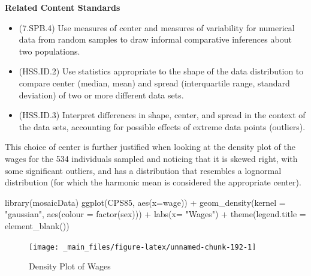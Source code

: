\documentclass[
]{book}
\newenvironment{Shaded}{\begin{snugshade}}{\end{snugshade}}
\newcommand{\AttributeTok}[1]{\textcolor[rgb]{0.77,0.63,0.00}{#1}}
\newcommand{\FunctionTok}[1]{\textcolor[rgb]{0.00,0.00,0.00}{#1}}
\newcommand{\NormalTok}[1]{#1}
\newcommand{\SpecialCharTok}[1]{\textcolor[rgb]{0.00,0.00,0.00}{#1}}
\newcommand{\StringTok}[1]{\textcolor[rgb]{0.31,0.60,0.02}{#1}}
\providecommand{\tightlist}{%
  \setlength{\itemsep}{0pt}\setlength{\parskip}{0pt}}
\newenvironment{standards}{}{}
\theoremstyle{definition}
\theoremstyle{definition}
\theoremstyle{definition}
\theoremstyle{definition}
\theoremstyle{remark}
\begin{document}
\begin{standards}

\begin{center}
\textbf{Related Content Standards}

\end{center}

\begin{itemize}
\tightlist
\item
  (7.SPB.4) Use measures of center and measures of variability for numerical data from random samples to draw informal comparative inferences about two populations.
\item
  (HSS.ID.2) Use statistics appropriate to the shape of the data distribution to compare center (median, mean) and spread (interquartile range, standard deviation) of two or more different data sets.
\item
  (HSS.ID.3) Interpret differences in shape, center, and spread in the context of the data sets, accounting for possible effects of extreme data points (outliers).
\end{itemize}

\end{standards}

This choice of center is further justified when looking at the density plot of the wages for the 534 individuals sampled and noticing that it is skewed right, with some significant outliers, and has a distribution that resembles a lognormal distribution (for which the harmonic mean is considered the appropriate center).

\begin{Shaded}
\begin{Highlighting}[]
\FunctionTok{library}\NormalTok{(mosaicData)}
\FunctionTok{ggplot}\NormalTok{(CPS85, }\FunctionTok{aes}\NormalTok{(}\AttributeTok{x=}\NormalTok{wage)) }\SpecialCharTok{+} \FunctionTok{geom\_density}\NormalTok{(}\AttributeTok{kernel =} \StringTok{"gaussian"}\NormalTok{, }\FunctionTok{aes}\NormalTok{(}\AttributeTok{colour =} \FunctionTok{factor}\NormalTok{(sex))) }\SpecialCharTok{+} \FunctionTok{labs}\NormalTok{(}\AttributeTok{x=} \StringTok{"Wages"}\NormalTok{) }\SpecialCharTok{+} \FunctionTok{theme}\NormalTok{(}\AttributeTok{legend.title =} \FunctionTok{element\_blank}\NormalTok{())}
\end{Highlighting}
\end{Shaded}

\begin{figure}

{\centering \texttt{[image: \_main\_files/figure-latex/unnamed-chunk-192-1]} 

}

\caption{Density Plot of Wages}\label{fig:unnamed-chunk-192}
\end{figure}
\end{document}
